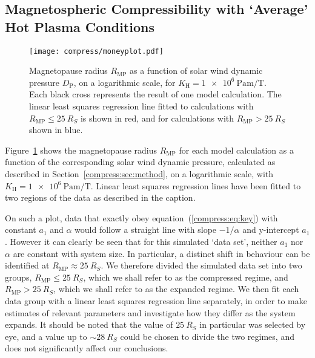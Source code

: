 \subsection{Magnetospheric Compressibility with `Average' Hot Plasma Conditions}
\begin{figure}
\centering
\noindent\texttt{[image: compress/moneyplot.pdf]}
\caption[Magnetopause radius versus solar wind dynamic pressure compressibility profile for `typical' hot plasma content $K_\mathrm{H}$.]{Magnetopause radius $R_\mathrm{MP}$ as a function of solar wind dynamic pressure $D_\mathrm{P}$, on a logarithmic scale, for $K_\mathrm{H}=\SI{1e6}{\pascal\meter\per\tesla}$. Each black cross represents the result of one model calculation. The linear least squares regression line fitted to calculations with $R_\mathrm{MP} \leq \SI{25}{R_S}$ is shown in red, and for calculations with $R_\mathrm{MP} > \SI{25}{R_S}$ shown in blue.}
\label{compress:fig:money1}
\end{figure}
Figure~\ref{compress:fig:money1} shows the magnetopause radius $R_\mathrm{MP}$ for each model calculation as a function of the corresponding solar wind dynamic pressure, calculated as described in Section~\ref{compress:sec:method}, on a logarithmic scale, with $K_\mathrm{H}=\SI{1e6}{\pascal\meter\per\tesla}$. Linear least squares regression lines have been fitted to two regions of the data as described in the caption.

On such a plot, data that exactly obey equation~(\ref{compress:eq:key}) with constant $a_1$ and $\alpha$ would follow a straight line with slope $-1/\alpha$ and y-intercept $a_1$. However it can clearly be seen that for this simulated `data set', neither $a_1$ nor $\alpha$ are constant with system size.
In particular, a distinct shift in behaviour can be identified at $R_\mathrm{MP} \approx \SI{25}{R_S}$. We therefore divided the simulated data set into two groups, $R_\mathrm{MP} \leq \SI{25}{R_S}$, which we shall refer to as the compressed regime, and $R_\mathrm{MP} > \SI{25}{R_S}$, which we shall refer to as the expanded regime. We then fit each data group with a linear least squares regression line separately, in order to make estimates of relevant parameters and investigate how they differ as the system expands. It should be noted that the value of $\SI{25}{R_S}$ in particular was selected by eye, and a value up to ${\sim}\SI{28}{R_S}$ could be chosen to divide the two regimes, and does not significantly affect our conclusions.

